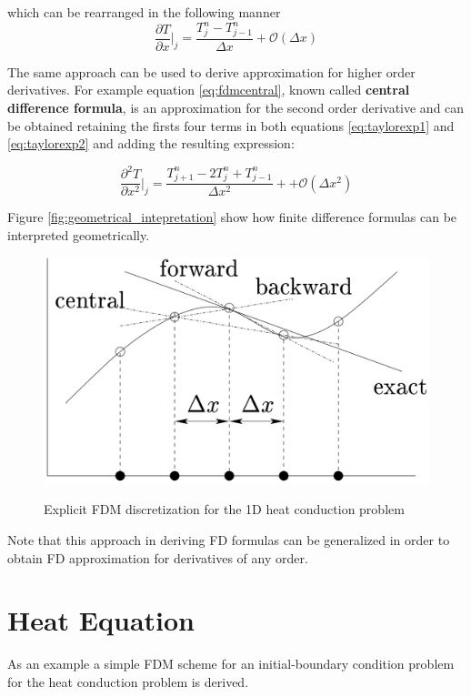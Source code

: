     which can be rearranged in the following manner
        \begin{equation}
    \frac{\partial T}{\partial x}\bigg\rvert_j  = \frac{T^n_{j} - T^n_{j-1}}{\Delta x} + \mathcal{O}(\Delta x)
    \label{eq:fdmfbackward}
    \end{equation}
    
   The same approach can be used to derive approximation for higher order derivatives.
   For example equation \ref{eq:fdmcentral}, known called \textbf{central difference formula}, is an approximation for the second order derivative and can be obtained retaining the firsts four terms in both equations \ref{eq:taylorexp1} and \ref{eq:taylorexp2} and adding the resulting expression:
   
    \begin{equation}
		\frac{\partial^2 T}{\partial x^2}\bigg\rvert_j = \frac{T^n_{j+1}- 2T^n_{j} + T^n_{j-1}}{\Delta x^2} + + \mathcal{O}(\Delta x^2)
		\label{eq:fdmcentral}
    \end{equation}
    
    Figure \ref{fig:geometrical_intepretation} show how finite difference formulas can be interpreted geometrically.
    \begin{figure}
\centering
\includegraphics[scale=0.3]{./images/CA_FDM/geometrical_interpretation_fd}
\label{fig:geometrical_intepretation}
\caption{Explicit FDM discretization for the 1D heat conduction problem}\label{torus}
\end{figure} 
    
Note that this approach in deriving FD formulas can be generalized in order to obtain FD approximation for derivatives of any order.
    \section{Heat Equation}
        As an example a simple FDM scheme for an initial-boundary condition problem for the heat conduction problem is derived. 
    
